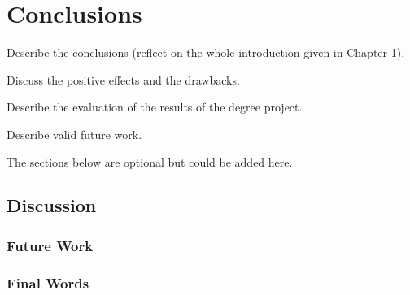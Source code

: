 \chapter{Conclusions}
\label{chap6}

Describe the conclusions (reflect on the whole introduction given in Chapter 1). 

Discuss the positive effects and the drawbacks. 

Describe the evaluation of the results of the degree project.

Describe valid future work.  

The sections below are optional but could be added here.

\section{Discussion}

\subsection{Future Work}

\subsection{Final Words}







